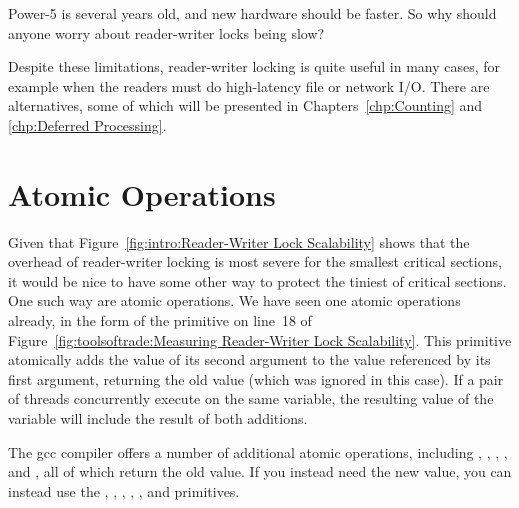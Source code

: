 \QuickQuiz{}
	Power-5 is several years old, and new hardware should
	be faster.
	So why should anyone worry about reader-writer locks being slow?
 \QuickQuizEnd

Despite these limitations, reader-writer locking is quite useful in many
cases, for example when the readers must do high-latency file or network I/O.
There are alternatives, some of which will be presented in
Chapters~\ref{chp:Counting} and \ref{chp:Deferred Processing}.

\section{Atomic Operations}
\label{sec:toolsoftrade:Atomic Operations}

Given that
Figure~\ref{fig:intro:Reader-Writer Lock Scalability}
shows that the overhead of reader-writer locking is most severe for the
smallest critical sections, it would be nice to have some other way
to protect the tiniest of critical sections.
One such way are atomic operations.
We have seen one atomic operations already, in the form of the
 primitive on line~18 of
Figure~\ref{fig:toolsoftrade:Measuring Reader-Writer Lock Scalability}.
This primitive atomically adds the value of its second argument to
the value referenced by its first argument, returning the old value
(which was ignored in this case).
If a pair of threads concurrently execute  on
the same variable, the resulting value of the variable will include
the result of both additions.

The {\sf gcc} compiler offers a number of additional atomic operations,
including ,
,
,
, and
, all of which return the old value.
If you instead need the new value, you can instead use the
,
,
,
,
, and
 primitives.

